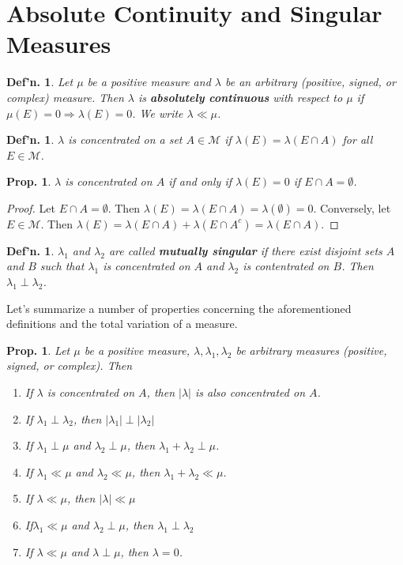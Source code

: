 \documentclass[12pt, a4paper]{book}
\newtheorem{definition}[theorem]{Def'n.}
\newtheorem{proposition}[theorem]{Prop.}
\theoremstyle{nonumberplain}
\newtheorem{proof}{Proof}
\begin{document}
\section{Absolute Continuity and Singular Measures}
\begin{definition}
    Let $\mu$ be a positive measure and $\lambda$ be an arbitrary (positive, signed, or complex) measure.
    Then $\lambda$ is \textbf{absolutely continuous} with respect to $\mu$ if $\mu(E)=0\Rightarrow\lambda(E)=0$.
    We write $\lambda\ll\mu$.
\end{definition}
\begin{definition}
    $\lambda$ is concentrated on a set $A\in\mathcal{M}$ if $\lambda(E)=\lambda(E\cap A)$ for all $E\in\mathcal{M}$.
\end{definition}
\begin{proposition}
    $\lambda$ is concentrated on $A$ if and only if $\lambda(E)=0$ if $E\cap A=\emptyset$.
\end{proposition}
\begin{proof}
    Let $E\cap A=\emptyset$.
    Then $\lambda(E)=\lambda(E\cap A)=\lambda(\emptyset)=0$.
    Conversely, let $E\in\mathcal{M}$.
    Then $\lambda(E)=\lambda(E\cap A)+\lambda(E\cap A^c)=\lambda(E\cap A)$.
\end{proof}
\begin{definition}
    $\lambda_1$ and $\lambda_2$ are called \textbf{mutually singular} if there exist disjoint sets $A$ and $B$ such that $\lambda_1$ is concentrated on $A$ and $\lambda_2$ is contentrated on $B$.
    Then $\lambda_1\perp\lambda_2$.
\end{definition}
Let's summarize a number of properties concerning the aforementioned definitions and the total variation of a measure.
\begin{proposition}
    Let $\mu$ be a positive measure, $\lambda,\lambda_1,\lambda_2$ be arbitrary measures (positive, signed, or complex).
    Then
    \begin{enumerate}[nolistsep]
        \item If $\lambda$ is concentrated on $A$, then $|\lambda|$ is also concentrated on $A$.
        \item If $\lambda_1\perp\lambda_2$, then $|\lambda_1|\perp|\lambda_2|$
        \item If $\lambda_1\perp\mu$ and $\lambda_2\perp\mu$, then $\lambda_1+\lambda_2\perp\mu$.
        \item If $\lambda_1\ll\mu$ and $\lambda_2\ll\mu$, then $\lambda_1+\lambda_2\ll\mu$.
        \item If $\lambda\ll\mu$, then $|\lambda|\ll\mu$
        \item If$\lambda_1\ll\mu$ and $\lambda_2\perp\mu$, then $\lambda_1\perp\lambda_2$
        \item If $\lambda\ll\mu$ and $\lambda\perp\mu$, then $\lambda=0$.
    \end{enumerate}
\end{proposition}
\end{document}
